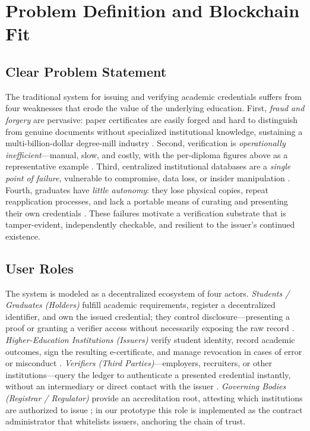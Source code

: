 \documentclass[conference]{IEEEtran}
\begin{document}
\section{Problem Definition and Blockchain Fit}

\subsection{Clear Problem Statement}
The traditional system for issuing and verifying academic credentials suffers from four weaknesses that erode the value of the underlying education. First, \emph{fraud and forgery} are pervasive: paper certificates are easily forged and hard to distinguish from genuine documents without specialized institutional knowledge, sustaining a multi-billion-dollar degree-mill industry \cite{slr_certificate,cheng_smartcontract}. Second, verification is \emph{operationally inefficient}---manual, slow, and costly, with the per-diploma figures above as a representative example \cite{castro_diplomas,capece_trust}. Third, centralized institutional databases are a \emph{single point of failure}, vulnerable to compromise, data loss, or insider manipulation \cite{slr_certificate,alhemairy_uae}. Fourth, graduates have \emph{little autonomy}: they lose physical copies, repeat reapplication processes, and lack a portable means of curating and presenting their own credentials \cite{cheng_smartcontract,capece_trust}. These failures motivate a verification substrate that is tamper-evident, independently checkable, and resilient to the issuer's continued existence.

\subsection{User Roles}
The system is modeled as a decentralized ecosystem of four actors. \emph{Students / Graduates (Holders)} fulfill academic requirements, register a decentralized identifier, and own the issued credential; they control disclosure---presenting a proof or granting a verifier access without necessarily exposing the raw record \cite{slr_certificate,berrios_zkbar}. \emph{Higher-Education Institutions (Issuers)} verify student identity, record academic outcomes, sign the resulting e-certificate, and manage revocation in cases of error or misconduct \cite{berrios_zkbar,cheng_smartcontract,rustemi_diar}. \emph{Verifiers (Third Parties)}---employers, recruiters, or other institutions---query the ledger to authenticate a presented credential instantly, without an intermediary or direct contact with the issuer \cite{cheng_smartcontract}. \emph{Governing Bodies (Registrar / Regulator)} provide an accreditation root, attesting which institutions are authorized to issue \cite{alhemairy_uae}; in our prototype this role is implemented as the contract administrator that whitelists issuers, anchoring the chain of trust.
\end{document}
